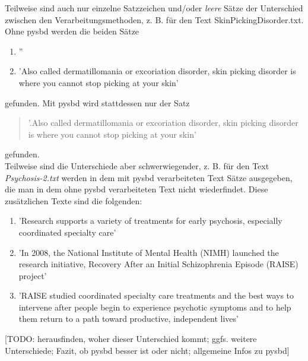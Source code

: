Teilweise sind auch nur einzelne Satzzeichen und/oder \emph{leere} Sätze der Unterschied zwischen den Verarbeitungsmethoden, z. B. für den Text SkinPickingDisorder.txt. Ohne pysbd werden die beiden Sätze
\begin{enumerate}
	\item ''
	\item 'Also called dermatillomania or excoriation disorder, skin picking disorder is where you cannot stop picking at your skin'
\end{enumerate}
gefunden.
Mit pysbd wird stattdessen nur der Satz 
\begin{quotation}
	'.Also called dermatillomania or excoriation disorder, skin picking disorder is where you cannot stop picking at your skin'
\end{quotation}
gefunden.\\

Teilweise sind die Unterschiede aber schwerwiegender, z. B. für den Text \emph{Psychosis-2.txt} werden in dem mit pysbd verarbeiteten Text Sätze ausgegeben, die man in dem ohne pysbd verarbeiteten Text nicht wiederfindet. Diese zusätzlichen Texte sind die folgenden:
\begin{enumerate}
	\item 'Research supports a variety of treatments for early psychosis, especially coordinated specialty care'
	\item 'In 2008, the National Institute of Mental Health (NIMH) launched the research initiative, Recovery After an Initial Schizophrenia Episode (RAISE) project'
	\item 'RAISE studied coordinated specialty care treatments and the best ways to intervene after people begin to experience psychotic symptoms and to help them return to a path toward productive, independent lives'
\end{enumerate}

[TODO: herausfinden, woher dieser Unterschied kommt; ggfs. weitere Unterschiede; Fazit, ob pysbd besser ist oder nicht; allgemeine Infos zu pysbd]

